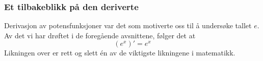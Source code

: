 \subsubsection{Et tilbakeblikk på den deriverte}
Derivasjon av potensfunksjoner var det som motiverte oss til å undersøke tallet $ e $. Av det vi har drøftet i de foregående avsnittene, følger det at
\[ \left(e^x\right)'=e^x \]
Likningen over er rett og slett én av de viktigste likningene i matematikk.
